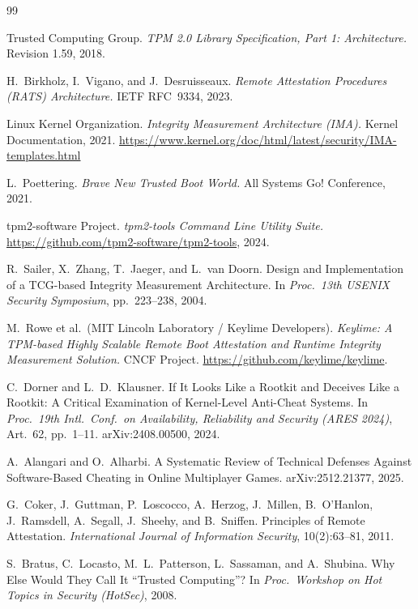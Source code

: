 \documentclass[11pt]{article}
\begin{document}

\begin{thebibliography}{99}

Trusted Computing Group. \textit{TPM 2.0 Library Specification, Part 1: Architecture.} Revision 1.59, 2018.

H.\ Birkholz, I.\ Vigano, and J.\ Desruisseaux. \textit{Remote Attestation Procedures (RATS) Architecture.} IETF RFC~9334, 2023.

Linux Kernel Organization. \textit{Integrity Measurement Architecture (IMA).} Kernel Documentation, 2021. \url{https://www.kernel.org/doc/html/latest/security/IMA-templates.html}

L.\ Poettering. \textit{Brave New Trusted Boot World.} All Systems Go! Conference, 2021.

tpm2-software Project. \textit{tpm2-tools Command Line Utility Suite.} \url{https://github.com/tpm2-software/tpm2-tools}, 2024.

R.\ Sailer, X.\ Zhang, T.\ Jaeger, and L.\ van Doorn. Design and Implementation of a TCG-based Integrity Measurement Architecture. In \textit{Proc.\ 13th USENIX Security Symposium}, pp.\ 223--238, 2004.

M.\ Rowe et al.\ (MIT Lincoln Laboratory / Keylime Developers). \textit{Keylime: A TPM-based Highly Scalable Remote Boot Attestation and Runtime Integrity Measurement Solution.} CNCF Project. \url{https://github.com/keylime/keylime}.

C.\ Dorner and L.\ D.\ Klausner. If It Looks Like a Rootkit and Deceives Like a Rootkit: A Critical Examination of Kernel-Level Anti-Cheat Systems. In \textit{Proc.\ 19th Intl.\ Conf.\ on Availability, Reliability and Security (ARES 2024)}, Art.\ 62, pp.\ 1--11. arXiv:2408.00500, 2024.

A.\ Alangari and O.\ Alharbi. A Systematic Review of Technical Defenses Against Software-Based Cheating in Online Multiplayer Games. arXiv:2512.21377, 2025.

G.\ Coker, J.\ Guttman, P.\ Loscocco, A.\ Herzog, J.\ Millen, B.\ O'Hanlon, J.\ Ramsdell, A.\ Segall, J.\ Sheehy, and B.\ Sniffen. Principles of Remote Attestation. \textit{International Journal of Information Security}, 10(2):63--81, 2011.

S.\ Bratus, C.\ Locasto, M.\ L.\ Patterson, L.\ Sassaman, and A.\ Shubina. Why Else Would They Call It ``Trusted Computing''? In \textit{Proc.\ Workshop on Hot Topics in Security (HotSec)}, 2008.


\end{thebibliography}
\end{document}
